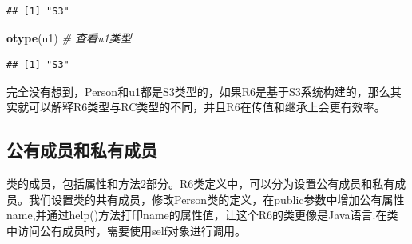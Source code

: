 \documentclass[]{book}
\newenvironment{Shaded}{\begin{snugshade}}{\end{snugshade}}
\newcommand{\KeywordTok}[1]{\textcolor[rgb]{0.13,0.29,0.53}{\textbf{#1}}}
\newcommand{\DataTypeTok}[1]{\textcolor[rgb]{0.13,0.29,0.53}{#1}}
\newcommand{\StringTok}[1]{\textcolor[rgb]{0.31,0.60,0.02}{#1}}
\newcommand{\CommentTok}[1]{\textcolor[rgb]{0.56,0.35,0.01}{\textit{#1}}}
\newcommand{\OtherTok}[1]{\textcolor[rgb]{0.56,0.35,0.01}{#1}}
\newcommand{\ControlFlowTok}[1]{\textcolor[rgb]{0.13,0.29,0.53}{\textbf{#1}}}
\newcommand{\OperatorTok}[1]{\textcolor[rgb]{0.81,0.36,0.00}{\textbf{#1}}}
\newcommand{\NormalTok}[1]{#1}
\begin{document}
\begin{verbatim}
## [1] "S3"
\end{verbatim}

\begin{Shaded}
\begin{Highlighting}[]
\KeywordTok{otype}\NormalTok{(u1) }\CommentTok{# 查看u1类型}
\end{Highlighting}
\end{Shaded}

\begin{verbatim}
## [1] "S3"
\end{verbatim}

完全没有想到，Person和u1都是S3类型的，如果R6是基于S3系统构建的，那么其实就可以解释R6类型与RC类型的不同，并且R6在传值和继承上会更有效率。

\subsection{公有成员和私有成员}

类的成员，包括属性和方法2部分。R6类定义中，可以分为设置公有成员和私有成员。我们设置类的共有成员，修改Person类的定义，在public参数中增加公有属性name,并通过help()方法打印name的属性值，让这个R6的类更像是Java语言.在类中访问公有成员时，需要使用self对象进行调用。

\begin{Shaded}
\end{Shaded}
\end{document}
